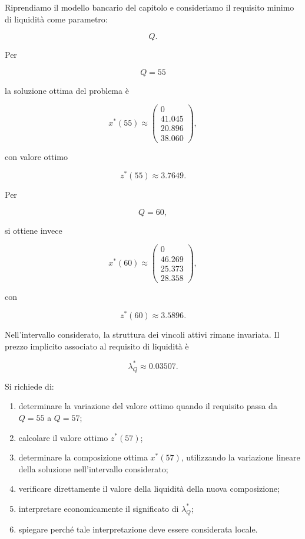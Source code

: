 \begin{exercise}

\label{ex:cap11-sensibilita-liquidita}

Riprendiamo il modello bancario del capitolo e consideriamo il requisito minimo
di liquidit\`a come parametro:

\[
Q.
\]

Per

\[
Q=55
\]

\noindent la soluzione ottima del problema \`e

\[
x^*(55)
\approx
\begin{pmatrix}
0\\
41.045\\
20.896\\
38.060
\end{pmatrix},
\]

\noindent con valore ottimo

\[
z^*(55)
\approx
3.7649.
\]

Per

\[
Q=60,
\]

\noindent si ottiene invece

\[
x^*(60)
\approx
\begin{pmatrix}
0\\
46.269\\
25.373\\
28.358
\end{pmatrix},
\]

\noindent con

\[
z^*(60)
\approx
3.5896.
\]

Nell'intervallo considerato, la struttura dei vincoli attivi rimane invariata.
Il prezzo implicito associato al requisito di liquidit\`a \`e

\[
\lambda_Q^*
\approx
0.03507.
\]

Si richiede di:

\begin{enumerate}

\item determinare la variazione del valore ottimo quando il requisito passa
da \(Q=55\) a \(Q=57\);

\item calcolare il valore ottimo \(z^*(57)\);

\item determinare la composizione ottima \(x^*(57)\), utilizzando la
variazione lineare della soluzione nell'intervallo considerato;

\item verificare direttamente il valore della liquidit\`a della nuova
composizione;

\item interpretare economicamente il significato di
\(\lambda_Q^*\);

\item spiegare perch\'e tale interpretazione deve essere considerata locale.

\end{enumerate}

\end{exercise}

